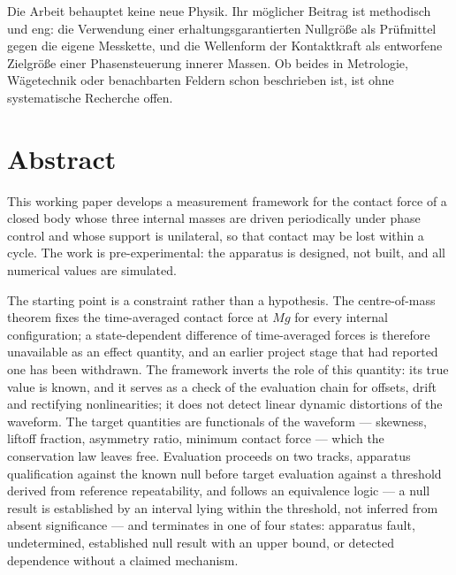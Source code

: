 \documentclass[12pt,a4paper]{report}
\begin{document}
Die Arbeit behauptet keine neue Physik. Ihr möglicher Beitrag ist
methodisch und eng: die Verwendung einer erhaltungsgarantierten Nullgröße
als Prüfmittel gegen die eigene Messkette, und die Wellenform der
Kontaktkraft als entworfene Zielgröße einer Phasensteuerung innerer
Massen. Ob beides in Metrologie, Wägetechnik oder benachbarten Feldern
schon beschrieben ist, ist ohne systematische Recherche offen.

\clearpage

\chapter*{Abstract}

This working paper develops a measurement framework for the contact force of a
closed body whose three internal masses are driven periodically under
phase control and whose support is unilateral, so that contact may be
lost within a cycle. The work is pre-experimental: the apparatus is
designed, not built, and all numerical values are simulated.

The starting point is a constraint rather than a hypothesis. The
centre-of-mass theorem fixes the time-averaged contact force at $Mg$ for
every internal configuration; a state-dependent difference of
time-averaged forces is therefore unavailable as an effect quantity, and
an earlier project stage that had reported one has been withdrawn. The
framework inverts the role of this quantity: its true value is known,
and it serves as a check of the evaluation chain for offsets, drift and
rectifying nonlinearities; it does not detect linear dynamic distortions
of the waveform.
The target quantities are functionals of the waveform --- skewness,
liftoff fraction, asymmetry ratio, minimum contact force --- which the
conservation law leaves free. Evaluation proceeds on two tracks,
apparatus qualification against the known null before target evaluation
against a threshold derived from reference repeatability, and
follows an equivalence logic --- a null result is established by an
interval lying within the threshold, not inferred from absent
significance --- and terminates in one of four states: apparatus fault,
undetermined, established null result with an upper bound, or detected
dependence without a claimed mechanism.
\end{document}
